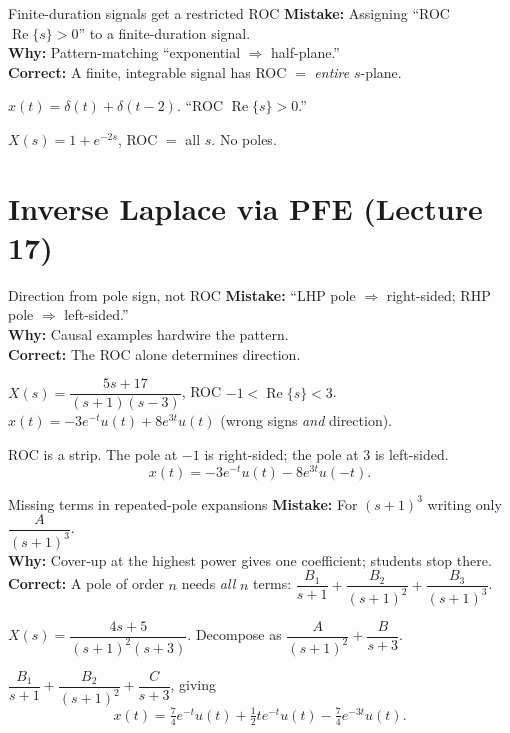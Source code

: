 \documentclass[11pt]{article}
\renewcommand{\Re}{\operatorname{Re}}
\begin{document}
\begin{pitfallbox}{Finite-duration signals get a restricted ROC}
\textbf{Mistake:} Assigning ``ROC $\Re\{s\}>0$'' to a finite-duration signal.\\
\textbf{Why:} Pattern-matching ``exponential $\Rightarrow$ half-plane.''\\
\textbf{Correct:} A finite, integrable signal has ROC $=$ \emph{entire} $s$-plane.
\begin{wrongbox}
$x(t) = \delta(t) + \delta(t-2)$. ``ROC $\Re\{s\}>0$.''
\end{wrongbox}
\begin{rightbox}
$X(s) = 1 + e^{-2s}$, ROC $=$ all $s$. No poles.
\end{rightbox}
\end{pitfallbox}

\section{Inverse Laplace via PFE (Lecture 17)}

\begin{pitfallbox}{Direction from pole sign, not ROC}
\textbf{Mistake:} ``LHP pole $\Rightarrow$ right-sided; RHP pole $\Rightarrow$ left-sided.''\\
\textbf{Why:} Causal examples hardwire the pattern.\\
\textbf{Correct:} The ROC alone determines direction.
\begin{wrongbox}
$X(s) = \dfrac{5s+17}{(s+1)(s-3)}$, ROC $-1 < \Re\{s\} < 3$.\\
$x(t) = -3e^{-t}u(t) + 8e^{3t}u(t)$ (wrong signs \emph{and} direction).
\end{wrongbox}
\begin{rightbox}
ROC is a strip. The pole at $-1$ is right-sided; the pole at $3$ is left-sided.
$$x(t) = -3 e^{-t}u(t) - 8 e^{3t} u(-t).$$
\end{rightbox}
\end{pitfallbox}

\begin{pitfallbox}{Missing terms in repeated-pole expansions}
\textbf{Mistake:} For $(s+1)^3$ writing only $\dfrac{A}{(s+1)^3}$.\\
\textbf{Why:} Cover-up at the highest power gives one coefficient; students stop there.\\
\textbf{Correct:} A pole of order $n$ needs \emph{all} $n$ terms: $\dfrac{B_1}{s+1} + \dfrac{B_2}{(s+1)^2} + \dfrac{B_3}{(s+1)^3}$.
\begin{wrongbox}
$X(s) = \dfrac{4s+5}{(s+1)^2(s+3)}$. Decompose as $\dfrac{A}{(s+1)^2}+\dfrac{B}{s+3}$.
\end{wrongbox}
\begin{rightbox}
$\dfrac{B_1}{s+1} + \dfrac{B_2}{(s+1)^2} + \dfrac{C}{s+3}$, giving
$$x(t) = \tfrac{7}{4} e^{-t}u(t) + \tfrac{1}{2} t e^{-t}u(t) - \tfrac{7}{4} e^{-3t}u(t).$$
\end{rightbox}
\end{pitfallbox}
\end{document}
